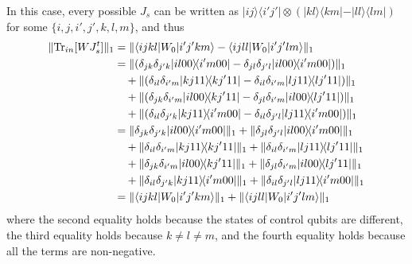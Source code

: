 \documentclass[a4paper,twocolumn,accepted=2022-10-23]{quantumarticle}
\newcommand{\bra}[1]{\langle {#1} \vert}
\newcommand{\ket}[1]{\vert {#1} \rangle}
\newcommand{\ketbra}[2]{\vert {#1} \rangle\!\langle {#2} \vert}
\newcommand{\Tr}[0]{{\mathrm{Tr}}}
\theoremstyle{definition}
\begin{document}
In this case, every possible $J_s$ can be written as $\ketbra{ij}{i'j'} \otimes (\ketbra{kl}{km} - \ketbra{ll}{lm} )$ for some $\{i,j,i',j',k,l,m\}$, and thus
\begin{align}
\| \Tr_{in} [W J_s^t] \|_1
&= \| \bra{ijkl} {W_0} \ket{i'j'km} - \bra{ijll} {W_0} \ket{i'j'lm}  \|_1 \\
&= \| (\delta_{jk}\delta_{j'k} \ketbra{il00}{i'm00} - \delta_{jl}\delta_{j'l} \ketbra{il00}{i'm00}) \|_1 \notag \\
&\quad+ \| (\delta_{il}\delta_{i'm} \ketbra{kj11}{kj'11} - \delta_{il}\delta_{i'm} \ketbra{lj11}{lj'11}) \|_1 \notag \\
&\quad+ \| (\delta_{jk}\delta_{i'm} \ketbra{il00}{kj'11} - \delta_{jl}\delta_{i'm} \ketbra{il00}{lj'11} ) \|_1 \notag \\
&\quad+ \| (\delta_{il}\delta_{j'k} \ketbra{kj11}{i'm00} - \delta_{il}\delta_{j'l} \ketbra{lj11}{i'm00}) \|_1 \\
%
&= \| \delta_{jk}\delta_{j'k} \ketbra{il00}{i'm00} \|_1 + \| \delta_{jl}\delta_{j'l} \ketbra{il00}{i'm00} \|_1 \notag \\
&\quad+ \| \delta_{il}\delta_{i'm} \ketbra{kj11}{kj'11} \|_1 + \| \delta_{il}\delta_{i'm} \ketbra{lj11}{lj'11} \|_1 \notag \\
&\quad+ \| \delta_{jk}\delta_{i'm} \ketbra{il00}{kj'11} \|_1 + \| \delta_{jl}\delta_{i'm} \ketbra{il00}{lj'11} \|_1 \notag \\
&\quad+ \| \delta_{il}\delta_{j'k} \ketbra{kj11}{i'm00} \|_1 + \| \delta_{il}\delta_{j'l} \ketbra{lj11}{i'm00} \|_1 \\
%
&= \| \bra{ijkl} {W_0} \ket{i'j'km} \|_1 + \| \bra{ijll} {W_0} \ket{i'j'lm}  \|_1 \\
\end{align}
where the second equality holds because the states of control qubits are different,
the third equality holds because $k \neq l \neq m$,
and the fourth equality holds because all the terms are non-negative.
\end{document}
